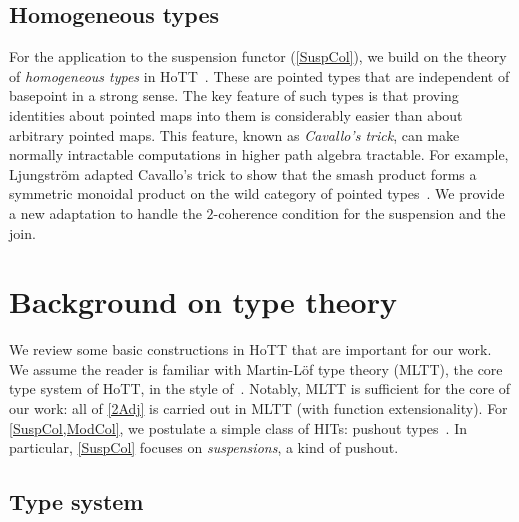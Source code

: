 \documentclass[10pt,a4paper]{article}
\theoremstyle{definition}
\theoremstyle{remark}
\newcommand{\0}{\mathbf{0}}
\newcommand{\1}{\mathbf{1}}
\newcommand{\2}{\mathbf{2}}
\begin{document}
\subsection{Homogeneous types}

For the application to the suspension functor (\autoref{SuspCol}), we build on the theory of \emph{homogeneous types} in HoTT~\cite[Section 2]{banded}. These are pointed types that are independent of basepoint in a strong sense. The key feature of such types is that proving identities about pointed maps into them is considerably easier than about arbitrary pointed maps. This feature, known as \emph{Cavallo's trick}, can make normally intractable computations in higher path algebra tractable. For example, Ljungstr\"om adapted Cavallo's trick to show that the smash product forms a symmetric monoidal product on the wild category of pointed types~\cite{smashmon}. We provide a new adaptation to handle the $2$-coherence condition for the suspension and the join.

\section{Background on type theory}\label{Backg}

We review some basic constructions in HoTT that are important for our work. We assume the reader is familiar with Martin-L\"of type theory (MLTT), the core type system of HoTT, in the style of~\cite{Uni13}. Notably, MLTT is sufficient for the core of our work: all of \autoref{2Adj} is carried out in MLTT (with function extensionality). For \cref{SuspCol,ModCol}, we postulate a simple class of HITs: pushout types~\cite[Section 6.8]{Uni13}. In particular, \autoref{SuspCol} focuses on \emph{suspensions}, a kind of pushout.

\subsection{Type system}
\end{document}
